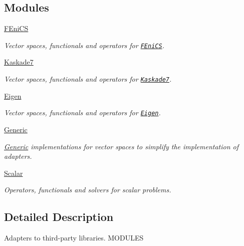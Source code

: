 \subsection*{\-Modules}
\begin{DoxyCompactItemize}
\item 
\hyperlink{group__FenicsGroup}{\-F\-Eni\-C\-S}
\begin{DoxyCompactList}\small\item\em \-Vector spaces, functionals and operators for \href{http://www.fenicsproject.org}{\tt \-F\-Eni\-C\-S}. \end{DoxyCompactList}\item 
\hyperlink{group__KaskadeGroup}{\-Kaskade7}
\begin{DoxyCompactList}\small\item\em \-Vector spaces, functionals and operators for \href{http://www.zib.de/projects/kaskade7-finite-element-toolbox}{\tt \-Kaskade7}. \end{DoxyCompactList}\item 
\hyperlink{group__EigenGroup}{\-Eigen}
\begin{DoxyCompactList}\small\item\em \-Vector spaces, functionals and operators for \href{http://eigen.tuxfamily.org}{\tt \-Eigen}. \end{DoxyCompactList}\item 
\hyperlink{group__GenericGroup}{\-Generic}
\begin{DoxyCompactList}\small\item\em \hyperlink{namespaceSpacy_1_1Generic}{\-Generic} implementations for vector spaces to simplify the implementation of adapters. \end{DoxyCompactList}\item 
\hyperlink{group__ScalarGroup}{\-Scalar}
\begin{DoxyCompactList}\small\item\em \-Operators, functionals and solvers for scalar problems. \end{DoxyCompactList}\end{DoxyCompactItemize}


\subsection{\-Detailed \-Description}
\-Adapters to third-\/party libraries. \-M\-O\-D\-U\-L\-E\-S 